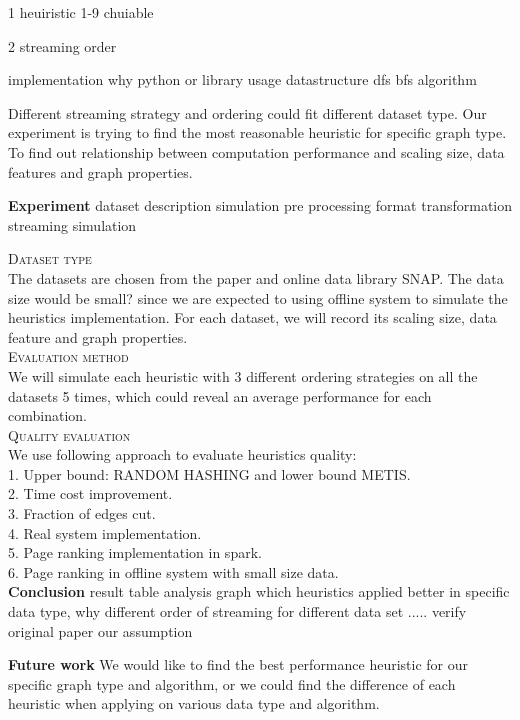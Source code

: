 \documentclass[12pt]{article}
\begin{document}
1 heuiristic
	1-9 chuiable

2 streaming order

implementation
	why python or library usage
	datastructure
	dfs bfs algorithm



Different streaming strategy and ordering could fit different dataset type. Our experiment is trying to find the most reasonable heuristic for specific graph type. To find out relationship between computation performance and scaling size, data features and graph properties.

\textbf{Experiment}
dataset description
simulation
	pre processing
	format transformation
	streaming simulation

\textsc{Dataset type}\\
The datasets are chosen from the paper and online data library SNAP. The data size would be small? since we are expected to using offline system to simulate the heuristics implementation. For each dataset, we will record its scaling size, data feature and graph properties.\\
\textsc{Evaluation method}\\
We will simulate each heuristic with 3 different ordering strategies on all the datasets 5 times, which could reveal an average performance for each combination.\\
\textsc{Quality evaluation}\\
We use following approach to evaluate heuristics quality:\\
1. Upper bound: RANDOM HASHING and lower bound METIS.\\
2. Time cost improvement.\\
3. Fraction of edges cut.\\
4. Real system implementation.\\
5. Page ranking implementation in spark.\\
6. Page ranking in offline system with small size data.\\

\textbf{Conclusion}
 result table
 analysis graph
 	which heuristics applied better in specific data type, why
	different order of streaming for different data set
	.....
verify original paper
our assumption

\textbf{Future work}
We would like to find the best performance heuristic for our specific graph type and algorithm, or we could find the difference of each heuristic when applying on various data type and algorithm.



\end{document}
